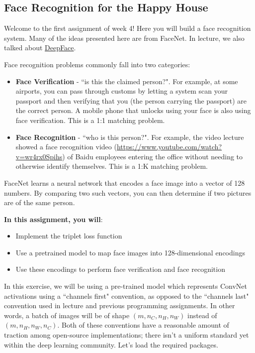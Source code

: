 \subsection{Face Recognition for the Happy House}
Welcome to the first assignment of week 4! Here you will build a face recognition system. Many of the ideas presented here are from FaceNet. In lecture, we also talked about \href{https://research.fb.com/wp-content/uploads/2016/11/deepface-closing-the-gap-to-human-level-performance-in-face-verification.pdf}{DeepFace}.

Face recognition problems commonly fall into two categories:
\begin{itemize}
\item {\textbf{Face Verification}} - ``is this the claimed person?". For example, at some airports, you can pass through customs by letting a system scan your passport and then verifying that you (the person carrying the passport) are the correct person. A mobile phone that unlocks using your face is also using face verification. This is a 1:1 matching problem.
\item {\textbf{Face Recognition}} - ``who is this person?". For example, the video lecture showed a face recognition video (\url{https://www.youtube.com/watch?v=wr4rx0Spihs}) of Baidu employees entering the office without needing to otherwise identify themselves. This is a 1:K matching problem.
\end{itemize}

FaceNet learns a neural network that encodes a face image into a vector of 128 numbers. By comparing two such vectors, you can then determine if two pictures are of the same person.


{\textbf{In this assignment, you will}}:
\begin{itemize}
\item Implement the triplet loss function
\item Use a pretrained model to map face images into 128-dimensional encodings
\item Use these encodings to perform face verification and face recognition
\end{itemize}

In this exercise, we will be using a pre-trained model which represents ConvNet activations using a ``channels first" convention, as opposed to the ``channels last" convention used in lecture and previous programming assignments. In other words, a batch of images will be of shape $(m, n_C, n_H, n_W)$ instead of $(m, n_H, n_W, n_C)$. Both of these conventions have a reasonable amount of traction among open-source implementations; there isn't a uniform standard yet within the deep learning community. 
\clearpage
Let's load the required packages. 

